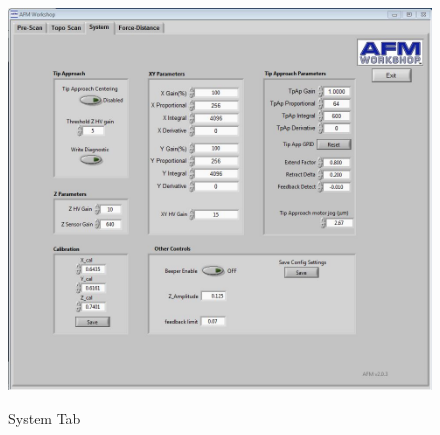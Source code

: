 \documentclass{../lab}
\begin{document}
\begin{figure}[h]
\centering
    \href{http://experimentationlab.berkeley.edu/sites/default/files/AFMImages/systemtab.JPG}{\includegraphics[width=0.82\linewidth]{images/systemtab.JPG}}
    \caption{System Tab}
\end{figure}

\pagebreak
\end{document}
